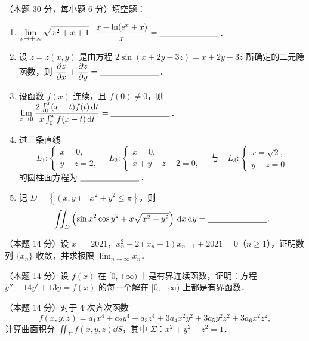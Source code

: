 
\begin{problems}

\item[一、]（本题 30 分，每小题 6 分）填空题：
\begin{enumerate}
  \item $\displaystyle\lim_{x\to+\infty}\sqrt{x^{2}+x+1}\cdot\frac{x-\ln(\mathrm{e}^{x}+x)}{x}=\underline{\hspace{2.5cm}}$．
  \item 设 $z=z(x,y)$ 是由方程 $2\sin(x+2y-3z)=x+2y-3z$ 所确定的二元隐函数，则 $\dfrac{\partial z}{\partial x}+\dfrac{\partial z}{\partial y}=\underline{\hspace{2.5cm}}$．
  \item 设函数 $f(x)$ 连续，且 $f(0)\neq0$，则 $\displaystyle\lim_{x\to0}\frac{2\int_{0}^{x}(x-t)f(t)\,\mathrm{d} t}{x\int_{0}^{x}f(x-t)\,\mathrm{d} t}=\underline{\hspace{2.5cm}}$．
  \item 过三条直线
  \[
  L_{1}:\begin{cases}x=0,\\ y-z=2,\end{cases}\quad
  L_{2}:\begin{cases}x=0,\\ x+y-z+2=0,\end{cases}\quad\text{与}\quad
  L_{3}:\begin{cases}x=\sqrt{2},\\ y-z=0\end{cases}
  \]
  的圆柱面方程为 $\underline{\hspace{2.5cm}}$．
  \item 记 $D=\left\{(x,y)\mid x^{2}+y^{2}\le\pi\right\}$，则
  \[
  \iint_{D}\left(\sin x^{2}\cos y^{2}+x\sqrt{x^{2}+y^{2}}\right)\,\mathrm{d} x\,\mathrm{d} y=\underline{\hspace{2.5cm}}.
  \]
\end{enumerate}

\item[二、]（本题 14 分）设 $x_{1}=2021$，$x_{n}^{2}-2(x_{n}+1)x_{n+1}+2021=0$（$n\ge1$），证明数列 $\{x_{n}\}$ 收敛，并求极限 $\displaystyle\lim_{n\to\infty}x_{n}$．

\item[三、]（本题 14 分）设 $f(x)$ 在 $[0,+\infty)$ 上是有界连续函数，证明：方程 $y''+14y'+13y=f(x)$ 的每一个解在 $[0,+\infty)$ 上都是有界函数．

\item[四、]（本题 14 分）对于 4 次齐次函数
\[
f(x,y,z)=a_{1}x^{4}+a_{2}y^{4}+a_{3}z^{4}+3a_{4}x^{2}y^{2}+3a_{5}y^{2}z^{2}+3a_{6}x^{2}z^{2},
\]
计算曲面积分 $\displaystyle\iint_{\Sigma}f(x,y,z)\dd S$，其中 $\Sigma$：$x^{2}+y^{2}+z^{2}=1$．


\end{problems}

